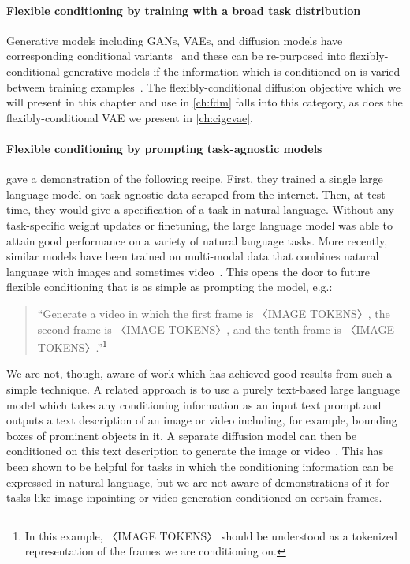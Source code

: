 \paragraph{Flexible conditioning by training with a broad task distribution}
Generative models including GANs, VAEs, and diffusion models have corresponding conditional variants~\citep{mirza2014conditional,sohn2015learning,tashiro2021csdi} and these can be re-purposed into flexibly-conditional generative models if the information which is conditioned on is varied between training examples~\citep{zhao2021large,ivanov2018variational,tashiro2021csdi}. The flexibly-conditional diffusion objective which we will present in this chapter and use in \cref{ch:fdm} falls into this category, as does the flexibly-conditional VAE we present in \cref{ch:cigcvae}.

\paragraph{Flexible conditioning by prompting task-agnostic models}
\citet{brown2020language} gave a demonstration of the following recipe. First, they trained a single large language model on task-agnostic data scraped from the internet. Then, at test-time, they would give a specification of a task in natural language. Without any task-specific weight updates or finetuning, the large language model was able to attain good performance on a variety of natural language tasks. More recently, similar models have been trained on multi-modal data that combines natural language with images and sometimes video~\citep{openai2023gpt,team2023gemini,kondratyuk2023videopoet}. This opens the door to future flexible conditioning that is as simple as prompting the model, e.g.: 
\begin{quote}
    ``Generate a video in which the first frame is 〈IMAGE TOKENS〉, the second frame is 〈IMAGE TOKENS〉, and the tenth frame is 〈IMAGE TOKENS〉.''\footnote{In this example, 〈IMAGE TOKENS〉 should be understood as a tokenized representation of the frames we are conditioning on.}
\end{quote}
We are not, though, aware of work which has achieved good results from such a simple technique. A related approach is to use a purely text-based large language model which takes any conditioning information as an input text prompt and outputs a text description of an image or video including, for example, bounding boxes of prominent objects in it. A separate diffusion model can then be conditioned on this text description to generate the image or video~\citep{lian2023llm}. This has been shown to be helpful for tasks in which the conditioning information can be expressed in natural language, but we are not aware of demonstrations of it for tasks like image inpainting or video generation conditioned on certain frames.

